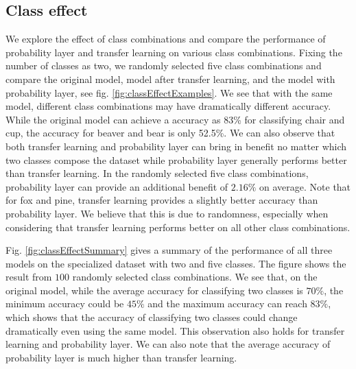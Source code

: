 \documentclass{article}
\begin{document}
\subsection{Class effect}
We explore the effect of class combinations and compare the performance of probability layer and transfer learning on various class combinations. Fixing the number of classes as two, we randomly selected five class combinations and compare the original model, model after transfer learning, and the model with probability layer, see fig. \ref{fig:classEffectExamples}. We see that with the same model, different class combinations may have dramatically different accuracy. While the original model can achieve a accuracy as 83\% for classifying chair and cup, the accuracy for beaver and bear is only 52.5\%. We can also observe that both transfer learning and probability layer can bring in benefit no matter which two classes compose the dataset while probability layer generally performs better than transfer learning. In the randomly selected five class combinations, probability layer can provide an additional benefit of $2.16\%$ on average. Note that for fox and pine, transfer learning provides a slightly better accuracy than probability layer. We believe that this is due to randomness, especially when considering that transfer learning performs better on all other class combinations. 

Fig. \ref{fig:classEffectSummary} gives a summary of the performance of all three models on the specialized dataset with two and five classes. The figure shows the result from $100$ randomly selected class combinations. We see that, on the original model, while the average accuracy for classifying two classes is $70\%$, the minimum accuracy could be $45\%$ and the maximum accuracy can reach $83\%$, which shows that the accuracy of classifying two classes could change dramatically even using the same model. This observation also holds for transfer learning and probability layer. We can also note that the average accuracy of probability layer is much higher than transfer learning. 
\end{document}
